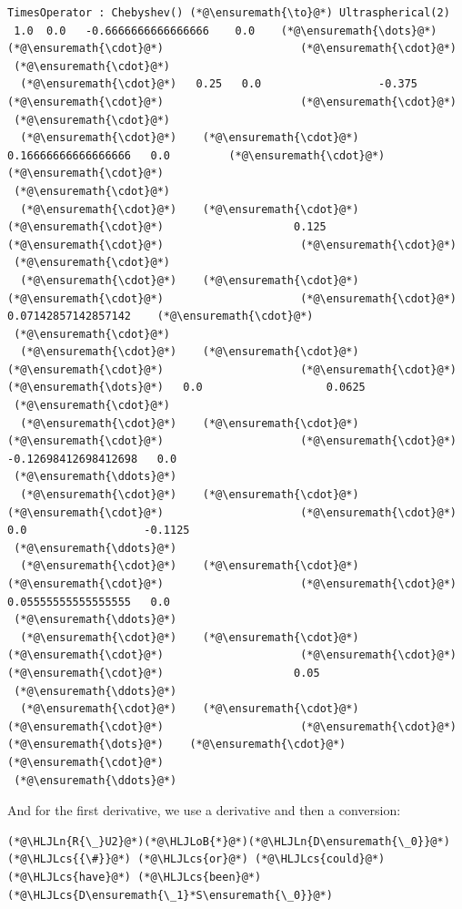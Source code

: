 \documentclass[12pt,a4paper]{article}
\newcommand{\HLJLn}[1]{#1}
\newcommand{\HLJLoB}[1]{\textcolor[RGB]{102,102,102}{\textbf{#1}}}
\newcommand{\HLJLcs}[1]{\textcolor[RGB]{153,153,119}{\textit{#1}}}
\begin{document}
\begin{lstlisting}
TimesOperator : Chebyshev() (*@\ensuremath{\to}@*) Ultraspherical(2)
 1.0  0.0   -0.6666666666666666    0.0    (*@\ensuremath{\dots}@*)    (*@\ensuremath{\cdot}@*)                     (*@\ensuremath{\cdot}@*)     
 (*@\ensuremath{\cdot}@*)
  (*@\ensuremath{\cdot}@*)   0.25   0.0                  -0.375       (*@\ensuremath{\cdot}@*)                     (*@\ensuremath{\cdot}@*)     
 (*@\ensuremath{\cdot}@*)
  (*@\ensuremath{\cdot}@*)    (*@\ensuremath{\cdot}@*)     0.16666666666666666   0.0         (*@\ensuremath{\cdot}@*)                     (*@\ensuremath{\cdot}@*)     
 (*@\ensuremath{\cdot}@*)
  (*@\ensuremath{\cdot}@*)    (*@\ensuremath{\cdot}@*)      (*@\ensuremath{\cdot}@*)                    0.125       (*@\ensuremath{\cdot}@*)                     (*@\ensuremath{\cdot}@*)     
 (*@\ensuremath{\cdot}@*)
  (*@\ensuremath{\cdot}@*)    (*@\ensuremath{\cdot}@*)      (*@\ensuremath{\cdot}@*)                     (*@\ensuremath{\cdot}@*)         0.07142857142857142    (*@\ensuremath{\cdot}@*)     
 (*@\ensuremath{\cdot}@*)
  (*@\ensuremath{\cdot}@*)    (*@\ensuremath{\cdot}@*)      (*@\ensuremath{\cdot}@*)                     (*@\ensuremath{\cdot}@*)     (*@\ensuremath{\dots}@*)   0.0                   0.0625 
 (*@\ensuremath{\cdot}@*)
  (*@\ensuremath{\cdot}@*)    (*@\ensuremath{\cdot}@*)      (*@\ensuremath{\cdot}@*)                     (*@\ensuremath{\cdot}@*)        -0.12698412698412698   0.0    
 (*@\ensuremath{\ddots}@*)
  (*@\ensuremath{\cdot}@*)    (*@\ensuremath{\cdot}@*)      (*@\ensuremath{\cdot}@*)                     (*@\ensuremath{\cdot}@*)         0.0                  -0.1125 
 (*@\ensuremath{\ddots}@*)
  (*@\ensuremath{\cdot}@*)    (*@\ensuremath{\cdot}@*)      (*@\ensuremath{\cdot}@*)                     (*@\ensuremath{\cdot}@*)         0.05555555555555555   0.0    
 (*@\ensuremath{\ddots}@*)
  (*@\ensuremath{\cdot}@*)    (*@\ensuremath{\cdot}@*)      (*@\ensuremath{\cdot}@*)                     (*@\ensuremath{\cdot}@*)          (*@\ensuremath{\cdot}@*)                    0.05   
 (*@\ensuremath{\ddots}@*)
  (*@\ensuremath{\cdot}@*)    (*@\ensuremath{\cdot}@*)      (*@\ensuremath{\cdot}@*)                     (*@\ensuremath{\cdot}@*)     (*@\ensuremath{\dots}@*)    (*@\ensuremath{\cdot}@*)                     (*@\ensuremath{\cdot}@*)     
 (*@\ensuremath{\ddots}@*)
\end{lstlisting}


And for the first derivative, we use a derivative and then a conversion:


\begin{lstlisting}
(*@\HLJLn{R{\_}U2}@*)(*@\HLJLoB{*}@*)(*@\HLJLn{D\ensuremath{\_0}}@*)  (*@\HLJLcs{{\#}}@*) (*@\HLJLcs{or}@*) (*@\HLJLcs{could}@*) (*@\HLJLcs{have}@*) (*@\HLJLcs{been}@*) (*@\HLJLcs{D\ensuremath{\_1}*S\ensuremath{\_0}}@*)
\end{lstlisting}
\end{document}
